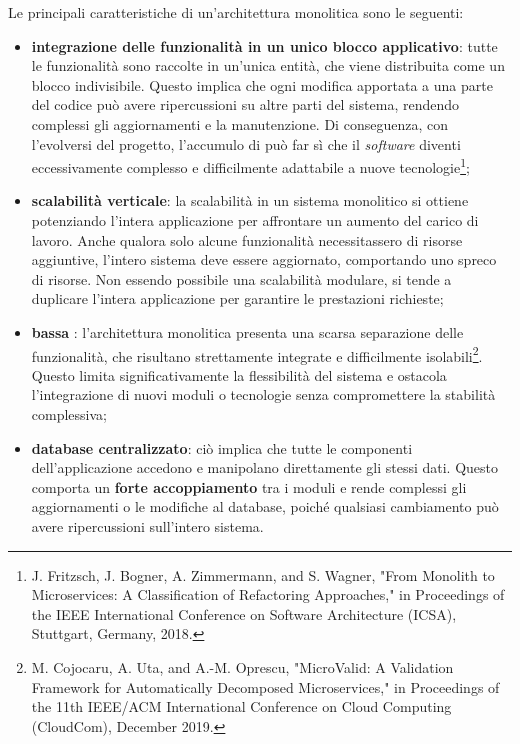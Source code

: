             \vspace{0.2 em}
            \noindent Le principali caratteristiche di un’architettura monolitica sono le seguenti:  

            \begin{itemize}
                \item \textbf{integrazione delle funzionalità in un unico blocco applicativo}: tutte le funzionalità sono raccolte in un’unica entità, che viene distribuita come un blocco indivisibile. Questo implica che ogni modifica apportata a una parte del codice può avere ripercussioni su altre parti del sistema, rendendo complessi gli aggiornamenti e la manutenzione. Di conseguenza, con l’evolversi del progetto, l’accumulo di  può far sì che il \textit{software} diventi eccessivamente complesso e difficilmente adattabile a nuove tecnologie\footnote{J. Fritzsch, J. Bogner, A. Zimmermann, and S. Wagner, "From Monolith to Microservices: A Classification of Refactoring Approaches," in Proceedings of the IEEE International Conference on Software Architecture (ICSA), Stuttgart, Germany, 2018.};
                \item  \textbf{scalabilità verticale}: la scalabilità in un sistema monolitico si ottiene potenziando l’intera applicazione per affrontare un aumento del carico di lavoro. Anche qualora solo alcune funzionalità necessitassero di risorse aggiuntive, l’intero sistema deve essere aggiornato, comportando uno spreco di risorse. Non essendo possibile una scalabilità modulare, si tende a duplicare l’intera applicazione per garantire le prestazioni richieste;
                \item \textbf{bassa} : l’architettura monolitica presenta una scarsa separazione delle funzionalità, che risultano strettamente integrate e difficilmente isolabili\footnote{M. Cojocaru, A. Uta, and A.-M. Oprescu, "MicroValid: A Validation Framework for Automatically Decomposed Microservices," in Proceedings of the 11th IEEE/ACM International Conference on Cloud Computing (CloudCom), December 2019.}. Questo limita significativamente la flessibilità del sistema e ostacola l’integrazione di nuovi moduli o tecnologie senza compromettere la stabilità complessiva; 
                \item \textbf{database centralizzato}: ciò implica che tutte le componenti dell’applicazione accedono e manipolano direttamente gli stessi dati. Questo comporta un \textbf{forte accoppiamento} tra i moduli e rende complessi gli aggiornamenti o le modifiche al database, poiché qualsiasi cambiamento può avere ripercussioni sull’intero sistema.
            \end{itemize}  

